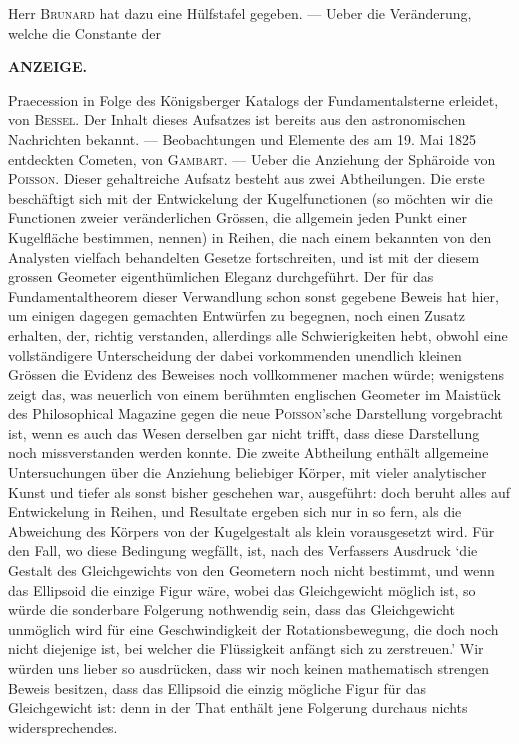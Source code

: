 Herr \textsc{Brunard} hat dazu eine Hülfstafel gegeben. — Ueber die Veränderung, welche die Constante der 
\par\clearpage\thispagestyle{empty}
\fancyhead[L]{}
\noindent{}\parbox[t]{\dimexpr\linewidth-24mm\relax}{\centering\scriptsize\bfseries ANZEIGE.}\makebox[12mm][r]{\large\bfseries }\par\nobreak\medskip\noindent Praecession in Folge des Königsberger Katalogs der Fundamentalsterne erleidet, von \textsc{Bessel}. Der Inhalt dieses Aufsatzes ist bereits aus den astronomischen Nachrichten bekannt. --- Beobachtungen und Elemente des am 19. Mai 1825 entdeckten Cometen, von \textsc{Gambart}. --- Ueber die Anziehung der Sphäroide von \textsc{Poisson}. Dieser gehaltreiche Aufsatz besteht aus zwei Abtheilungen. Die erste beschäftigt sich mit der Entwickelung der Kugelfunctionen (so möchten wir die Functionen zweier veränderlichen Grössen, die allgemein jeden Punkt einer Kugelfläche bestimmen, nennen) in Reihen, die nach einem bekannten von den Analysten vielfach behandelten Gesetze fortschreiten, und ist mit der diesem grossen Geometer eigenthümlichen Eleganz durchgeführt. Der für das Fundamentaltheorem dieser Verwandlung schon sonst gegebene Beweis hat hier, um einigen dagegen gemachten Entwürfen zu begegnen, noch einen Zusatz erhalten, der, richtig verstanden, allerdings alle Schwierigkeiten hebt, obwohl eine vollständigere Unterscheidung der dabei vorkommenden unendlich kleinen Grössen die Evidenz des Beweises noch vollkommener machen würde; wenigstens zeigt das, was neuerlich von einem berühmten englischen Geometer im Maistück des Philosophical Magazine gegen die neue \textsc{Poisson}'sche Darstellung vorgebracht ist, wenn es auch das Wesen derselben gar nicht trifft, dass diese Darstellung noch missverstanden werden konnte. Die zweite Abtheilung enthält allgemeine Untersuchungen über die Anziehung beliebiger Körper, mit vieler analytischer Kunst und tiefer als sonst bisher geschehen war, ausgeführt: doch beruht alles auf Entwickelung in Reihen, und Resultate ergeben sich nur in so fern, als die Abweichung des Körpers von der Kugelgestalt als klein vorausgesetzt wird. Für den Fall, wo diese Bedingung wegfällt, ist, nach des Verfassers Ausdruck ‘die Gestalt des Gleichgewichts von den Geometern noch nicht bestimmt, und wenn das Ellipsoid die einzige Figur wäre, wobei das Gleichgewicht möglich ist, so würde die sonderbare Folgerung nothwendig sein, dass das Gleichgewicht unmöglich wird für eine Geschwindigkeit der Rotationsbewegung, die doch noch nicht diejenige ist, bei welcher die Flüssigkeit anfängt sich zu zerstreuen.’ Wir würden uns lieber so ausdrücken, dass wir noch keinen mathematisch strengen Beweis besitzen, dass das Ellipsoid die einzig mögliche Figur für das Gleichgewicht ist: denn in der That enthält jene Folgerung durchaus nichts widersprechendes.
